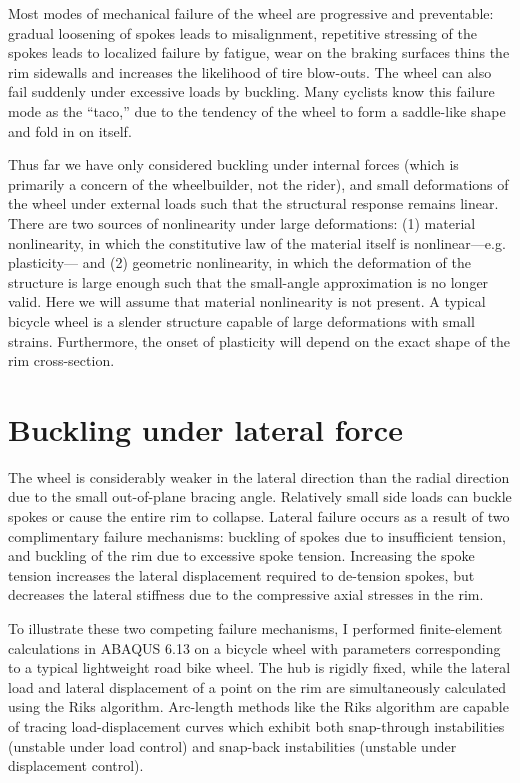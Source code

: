 \documentclass[\rootdir/thesis.tex]{subfiles}
\begin{document}
Most modes of mechanical failure of the wheel are progressive and preventable: gradual loosening of spokes leads to misalignment, repetitive stressing of the spokes leads to localized failure by fatigue, wear on the braking surfaces thins the rim sidewalls and increases the likelihood of tire blow-outs. The wheel can also fail suddenly under excessive loads by buckling. Many cyclists know this failure mode as the ``taco,'' due to the tendency of the wheel to form a saddle-like shape and fold in on itself.


Thus far we have only considered buckling under internal forces (which is primarily a concern of the wheelbuilder, not the rider), and small deformations of the wheel under external loads such that the structural response remains linear. There are two sources of nonlinearity under large deformations: (1) material nonlinearity, in which the constitutive law of the material itself is nonlinear---e.g. plasticity--- and (2) geometric nonlinearity, in which the deformation of the structure is large enough such that the small-angle approximation is no longer valid. Here we will assume that material nonlinearity is not present. A typical bicycle wheel is a slender structure capable of large deformations with small strains. Furthermore, the onset of plasticity will depend on the exact shape of the rim cross-section.


\section{Buckling under lateral force}

The wheel is considerably weaker in the lateral direction than the radial direction due to the small out-of-plane bracing angle. Relatively small side loads can buckle spokes or cause the entire rim to collapse. Lateral failure occurs as a result of two complimentary failure mechanisms: buckling of spokes due to insufficient tension, and buckling of the rim due to excessive spoke tension. Increasing the spoke tension increases the lateral displacement required to de-tension spokes, but decreases the lateral stiffness due to the compressive axial stresses in the rim.

To illustrate these two competing failure mechanisms, I performed finite-element calculations in ABAQUS 6.13 on a bicycle wheel with parameters corresponding to a typical lightweight road bike wheel. The hub is rigidly fixed, while the lateral load and lateral displacement of a point on the rim are simultaneously calculated using the Riks algorithm. Arc-length methods like the Riks algorithm are capable of tracing load-displacement curves which exhibit both snap-through instabilities (unstable under load control) and snap-back instabilities (unstable under displacement control).
\end{document}
